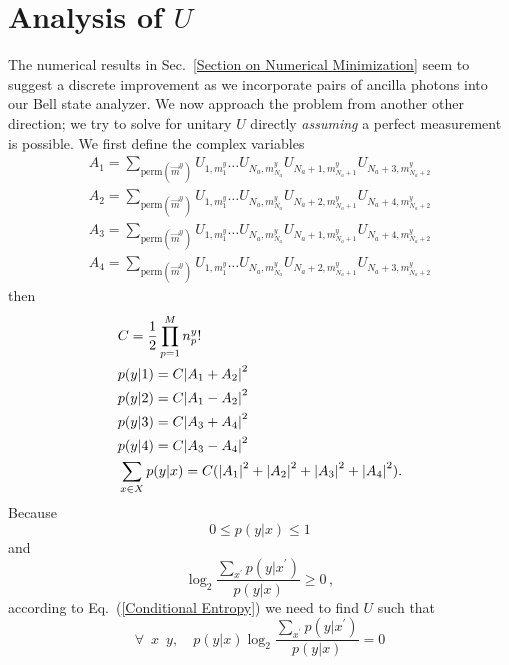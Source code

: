 \documentclass[aps,pra,twocolumn,showpacs,superscriptaddress,floatfix,10pt]{revtex4}
\begin{document}
\section{Analysis of $U$}
\label{Section on U Analysis}
The numerical results in Sec.~\ref{Section on Numerical Minimization} seem to suggest a discrete improvement as we incorporate pairs of ancilla photons into our Bell state analyzer. We now approach the problem from another other direction; we try to solve for unitary $U$ directly \textit{assuming} a perfect measurement is possible.
We first define the complex variables
\begin{eqnarray}
	 A_1 = \sum\limits_{\textrm{perm}(\vec{m}^y)} U_{1,m^y_1} \dots U_{N_a,m^y_{N_a}} U_{N_a+1,m^y_{N_a+1}} U_{N_a+3,m^y_{N_a+2}} \nonumber\\
	 A_2 = \sum\limits_{\textrm{perm}(\vec{m}^y)} U_{1,m^y_1} \dots U_{N_a,m^y_{N_a}} U_{N_a+2,m^y_{N_a+1}} U_{N_a+4,m^y_{N_a+2}} \nonumber\\
	 A_3 = \sum\limits_{\textrm{perm}(\vec{m}^y)} U_{1,m^y_1} \dots U_{N_a,m^y_{N_a}} U_{N_a+1,m^y_{N_a+1}} U_{N_a+4,m^y_{N_a+2}} \nonumber\\
	 A_4 = \sum\limits_{\textrm{perm}(\vec{m}^y)} U_{1,m^y_1} \dots U_{N_a,m^y_{N_a}} U_{N_a+2,m^y_{N_a+1}} U_{N_a+3,m^y_{N_a+2}} \nonumber
\end{eqnarray}
then
\begin{eqnarray}
	& C = \frac{1}{2}\prod_{p=1}^{M} n^y_p! \nonumber \\
	& p(y|1) = C \abs{A_1 + A_2}^2\nonumber \\
	& p(y|2) = C \abs{A_1 - A_2}^2 \\
	& p(y|3) = C \abs{A_3 + A_4}^2 \nonumber\\
	& p(y|4) = C \abs{A_3 - A_4}^2 \nonumber\\
	& \sum_{x \in X} p(y|x) = C(\abs{A_1}^2 + \abs{A_2}^2 + \abs{A_3}^2 + \abs{A_4}^2 ). \nonumber
\end{eqnarray}
Because 
\begin{equation}
	0 \le p(y|x) \le 1
\end{equation}
and
\begin{equation}
	\log_2 \frac{\sum_{x^\prime} p(y|x^\prime)}{p(y|x)} \ge 0 \,,
\end{equation}
according to Eq.~(\ref{Conditional Entropy}) we need to find $U$ such that
\begin{equation}
\label{Conditional Entropy Condition}
	\forall \enspace x \enspace y , \quad p(y|x) \log_2 \frac{\sum_{x^\prime} p(y|x^\prime)}{p(y|x)} = 0
\end{equation}
\end{document}
